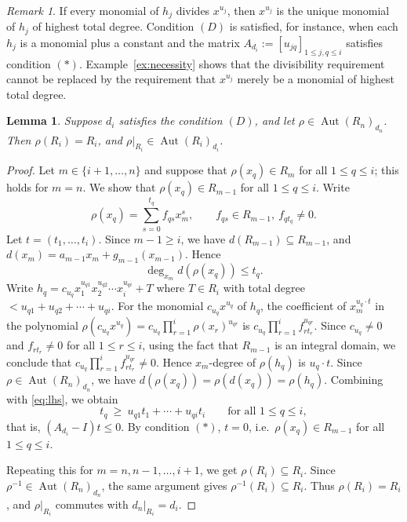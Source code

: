 \documentclass[11pt]{amsart}
\newtheorem{lemma}[theorem]{Lemma}
\theoremstyle{definition}
\theoremstyle{remark}
\newtheorem{remark}[theorem]{Remark}
\numberwithin{equation}{theorem}
\newcommand{\Aut}{\operatorname{Aut}}
\begin{document}
\begin{remark}
If every monomial of $h_j$ divides $x^{u_j}$, then $x^{u_j}$ is the unique monomial of $h_j$ of highest total degree. Condition $(D)$ is satisfied, for instance, when each $h_j$ is a monomial plus a constant and the matrix $A_{d_i}:=[u_{jq}]_{1\le j,q\le i}$ satisfies condition $(\ast)$. Example~\ref{ex:necessity} shows that the divisibility requirement cannot be replaced by the requirement that $x^{u_j}$ merely be a monomial of highest total degree.
\end{remark}
\begin{lemma}\label{lem:restriction}
Suppose $d_i$ satisfies the condition $(D)$, and let $\rho\in\Aut(R_n)_{d_n}$. Then $\rho(R_i)=R_i$, and
$\rho|_{R_i}\in\Aut(R_i)_{d_i}$.
\end{lemma}
\begin{proof}
    Let $m\in\{i+1,\dots,n\}$ and suppose that $\rho(x_q)\in R_m$ for all $1\le q\le i$; this holds for
$m=n$. We show that $\rho(x_q)\in R_{m-1}$ for all $1\le q\le i$. Write
\[
\rho(x_q)=\sum_{s=0}^{t_q}f_{qs}x_m^s,\qquad f_{qs}\in R_{m-1},\ f_{qt_q}\neq0.
\]
Let $t=(t_1,\dots,t_i)$. Since $m-1\ge i$, we have $d(R_{m-1})\subseteq R_{m-1}$, and $d(x_m)=a_{m-1}x_m+g_{m-1}(x_{m-1})$.
Hence
\begin{equation}\label{eq:lhs}
\deg_{x_m}d(\rho(x_q))\le t_q .
\end{equation}
Write $h_q=c_{u_q} x_1^{u_{q1}}x_2^{u_{q2}}\cdots x_i^{u_{qi}}+T$ where $T\in R_i$ with total degree $<u_{q1}+u_{q2}+\cdots +u_{qi}$. For the monomial $c_{u_q}x^{u_q}$ of $h_q$, the coefficient of $x_m ^{u_q \cdot t}$ in the polynomial $\rho(c_{u_q}x^{u_q})=c_{u_q}\prod_{r=1}^i\rho(x_r)^{u_{qr}}$ is $c_{u_q}\prod_{r=1}^i f_{rt_r}^{u_{qr}}$. Since $c_{u_q}\neq 0$ and $f_{rt_r}\neq 0$ for all $1\leq r \leq i$, using the fact that $R_{m-1}$ is an integral domain, we conclude that $c_{u_q}\prod_{r=1}^i f_{rt_r}^{u_{qr}}\neq 0$. Hence $x_m$-degree of $\rho(h_q)$ is $u_q\cdot t$. 
Since $\rho\in\Aut(R_n)_{d_n}$, we have $d(\rho(x_q))=\rho(d(x_q))=\rho(h_q)$.  Combining with \eqref{eq:lhs}, we obtain
\begin{equation}\label{eq:ineq}
t_q\ \ge\ u_{q1}t_1+\cdots+u_{qi}t_i\qquad\text{for all }1\le q\le i,
\end{equation}
that is, $(A_{d_i}-I)t\le0$. By condition $(\ast)$, $t=0$, i.e.\ $\rho(x_q)\in R_{m-1}$ for all $1\le q\le i$.

Repeating this for $m=n,n-1,\dots,i+1$, we get $\rho(R_i)\subseteq R_i$. Since
$\rho^{-1}\in\Aut(R_n)_{d_n}$, the same argument gives $\rho^{-1}(R_i)\subseteq R_i$. Thus
$\rho(R_i)=R_i$, and $\rho|_{R_i}$ commutes with $d_n|_{R_i}=d_i$.
\end{proof}
\end{document}
